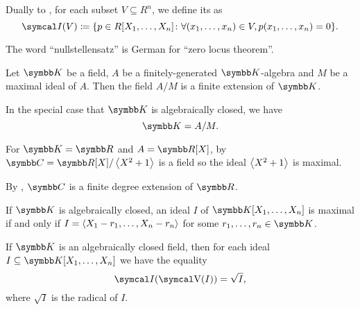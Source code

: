 \begin{definition}\label{def:ideal_of_affine_variety}\cite[70]{Коцев2016}
  Dually to , for each subset \( V \subseteq R^n \), we define its  as
  \begin{equation*}
    \Cal{I}(V) \coloneqq \{ p \in R[X_1, \ldots, X_n] \colon \forall (x_1, \ldots, x_n) \in V, p(x_1, \ldots, x_n) = 0 \}.
  \end{equation*}
\end{definition}

\begin{remark}\label{remark:nullstelletsatz_etymology}
  The word \enquote{nullstellensatz} is German for \enquote{zero locus theorem}.
\end{remark}

\begin{theorem}\label{thm:algebraic_nullstellensatz}\cite[64]{Коцев2016}
  Let \( \BK \) be a field, \( A \) be a finitely-generated \( \BK \)-algebra and \( M \) be a maximal ideal of \( A \). Then the field \( A / M \) is a finite extension of \( \BK \).

  In the special case that \( \BK \) is algebraically closed, we have
  \begin{equation*}
    \BK = A / M.
  \end{equation*}
\end{theorem}

\begin{example}\label{ex:algebraic_nullstellensatz_real_over_complex}
  For \( \BK = \BR \) and \( A = \BR[X] \), by  \( \BC = \BR[X] / \Gen{X^2 + 1} \) is a field so the ideal \( \left\langle X^2 + 1 \right\rangle \) is maximal.

  By , \( \BC \) is a finite degree extension of \( \BR \).
\end{example}

\begin{corollary}\label{thm:closed_field_maximal_ideal_representation}\cite[exercise 8.1]{Коцев2016}
  If \( \BK \) is algebraically closed, an ideal \( I \) of \( \BK[X_1, \ldots, X_n] \) is maximal if and only if \( I = \left\langle X_1 - r_1, \ldots, X_n - r_n \right\rangle \) for some \( r_1, \ldots, r_n \in \BK \).
\end{corollary}

\begin{theorem}\label{thm:geometric_nullstellensatz}\cite[70]{Коцев2016}
  If \( \BK \) is an algebraically closed field, then for each ideal \( I \subseteq \BK[X_1, \ldots, X_n] \) we have the equality
  \begin{equation*}
    \Cal{I}(\CV(I)) = \sqrt I,
  \end{equation*}
  where \( \sqrt I \) is the radical of \( I \).
\end{theorem}

